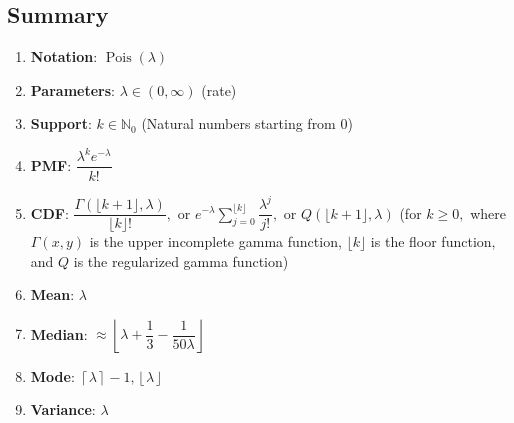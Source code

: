 \subsection{Summary}

\begin{enumerate}
    \item \textbf{Notation}:
    $
         {\displaystyle \operatorname {Pois} (\lambda )}
    $
    \hfill \cite{wiki/Poisson_distribution}

    \item \textbf{Parameters}:
    ${\displaystyle \lambda \in (0,\infty )}$ (rate)
    \hfill \cite{wiki/Poisson_distribution}

    \item \textbf{Support}:
    ${\displaystyle k\in \mathbb {N} _{0}}$ (Natural numbers starting from $0$)
    \hfill \cite{wiki/Poisson_distribution}

    \item \textbf{PMF}:
    $
         {\displaystyle {\dfrac {\lambda ^{k}e^{-\lambda }}{k!}}}
    $
    \hfill \cite{wiki/Poisson_distribution}

    \item \textbf{CDF}:
    ${\displaystyle {\dfrac {\Gamma (\lfloor k+1\rfloor ,\lambda )}{\lfloor k\rfloor !}},}$ or
    ${\displaystyle e^{-\lambda }\sum _{j=0}^{\lfloor k\rfloor }{\dfrac {\lambda ^{j}}{j!}},}$ or
    ${\displaystyle Q(\lfloor k+1\rfloor ,\lambda )}$
    (for ${\displaystyle k\geq 0,}$ where ${\displaystyle \Gamma (x,y)}$ is the upper incomplete gamma function, ${\displaystyle \lfloor k\rfloor }$ is the floor function, and ${\displaystyle Q}$ is the regularized gamma function)
    \hfill \cite{wiki/Poisson_distribution}

    \item \textbf{Mean}:
    $
         {\displaystyle \lambda }
    $
    \hfill \cite{wiki/Poisson_distribution}

    \item \textbf{Median}:
    $
         {\displaystyle \approx \left\lfloor \lambda +{\dfrac {1}{3}}-{\dfrac {1}{50\lambda }}\right\rfloor }
    $
    \hfill \cite{wiki/Poisson_distribution}

    \item \textbf{Mode}:
    $
         {\displaystyle \left\lceil \lambda \right\rceil -1,\left\lfloor \lambda \right\rfloor }
    $
    \hfill \cite{wiki/Poisson_distribution}

    \item \textbf{Variance}:
    $
         {\displaystyle \lambda }
    $
    \hfill \cite{wiki/Poisson_distribution}


\end{enumerate}
